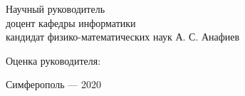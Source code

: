 \begin{adjustwidth}{2em}{0pt}
\noindent
Научный руководитель\\
доцент кафедры информатики\\
кандидат физико-математических наук
\null\hfill А. С. Анафиев
\end{adjustwidth}

\vspace*{1\baselineskip}

\begin{adjustwidth}{2em}{0pt}
\noindent
Оценка руководителя:  \underline{\hspace{7em}} \null\hfill \underline{\hspace{7em}}
\end{adjustwidth}

\vfill

\begin{center} Симферополь --- 2020 \end{center}
\thispagestyle{empty} %
\restoregeometry